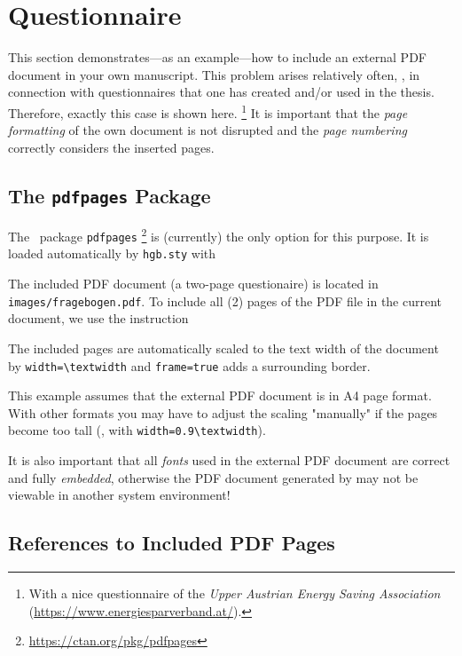 \chapter{Questionnaire}
\label{app:Questionnaire}

This section demonstrates---as an example---how to include an external PDF
document in your own \latex manuscript. This problem arises relatively often, 
\eg, in connection with questionnaires that one has created and/or used in
the thesis. Therefore, exactly this case is shown here.%
\footnote{With a nice questionnaire of the \emph{Upper Austrian Energy Saving
Association} (\url{https://www.energiesparverband.at/}).} 
It is important that the \emph{page formatting} of the own document is not
disrupted and the \emph{page numbering} correctly considers the inserted
pages.


\section{The \texttt{pdfpages} Package}

The \latex\ package \texttt{pdfpages}%
\footnote{\url{https://ctan.org/pkg/pdfpages}}
is (currently) the only option for this purpose. It is loaded automatically
by \nolinkurl{hgb.sty} with
%
\begin{LaTeXCode}[numbers=none]
\RequirePackage{pdfpages}
\end{LaTeXCode}
%
The included PDF document (a two-page questionaire) is located in
\nolinkurl{images/fragebogen.pdf}. To include all (2) pages of the PDF file
in the current document, we use the instruction
%
\begin{LaTeXCode}[numbers=none]

\end{LaTeXCode}
%
The included pages are automatically scaled to the text width of the \latex document
by \verb!width=\textwidth! and \verb!frame=true! adds a surrounding border.

This example assumes that the external PDF document is in A4 page format.
With other formats you may have to adjust the scaling "manually" if the pages become
too tall (\eg, with \verb!width=0.9\textwidth!).

It is also important that all \emph{fonts} used in the external PDF document are
correct and fully \emph{embedded}, otherwise the PDF document generated by \latex may
not be viewable in another system environment!


\section{References to Included PDF Pages}

